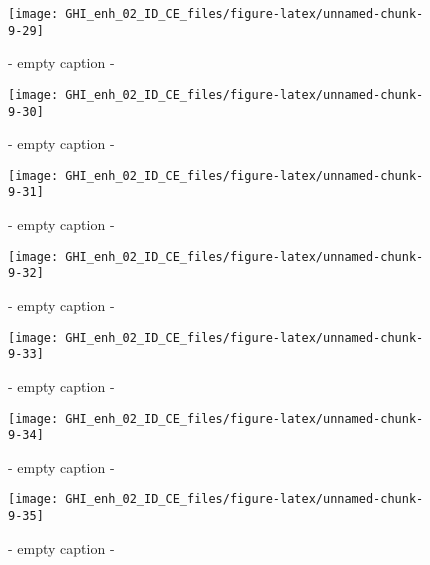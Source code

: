 \documentclass[
  10pt,
  a4paper,oneside]{article}
\begin{document}
\begin{figure}[H]

{\centering \texttt{[image: GHI\_enh\_02\_ID\_CE\_files/figure-latex/unnamed-chunk-9-29]} 

}

\caption{ - empty caption - }\label{fig:unnamed-chunk-9-29}
\end{figure}
\begin{figure}[H]

{\centering \texttt{[image: GHI\_enh\_02\_ID\_CE\_files/figure-latex/unnamed-chunk-9-30]} 

}

\caption{ - empty caption - }\label{fig:unnamed-chunk-9-30}
\end{figure}
\begin{figure}[H]

{\centering \texttt{[image: GHI\_enh\_02\_ID\_CE\_files/figure-latex/unnamed-chunk-9-31]} 

}

\caption{ - empty caption - }\label{fig:unnamed-chunk-9-31}
\end{figure}
\begin{figure}[H]

{\centering \texttt{[image: GHI\_enh\_02\_ID\_CE\_files/figure-latex/unnamed-chunk-9-32]} 

}

\caption{ - empty caption - }\label{fig:unnamed-chunk-9-32}
\end{figure}
\begin{figure}[H]

{\centering \texttt{[image: GHI\_enh\_02\_ID\_CE\_files/figure-latex/unnamed-chunk-9-33]} 

}

\caption{ - empty caption - }\label{fig:unnamed-chunk-9-33}
\end{figure}
\begin{figure}[H]

{\centering \texttt{[image: GHI\_enh\_02\_ID\_CE\_files/figure-latex/unnamed-chunk-9-34]} 

}

\caption{ - empty caption - }\label{fig:unnamed-chunk-9-34}
\end{figure}
\begin{figure}[H]

{\centering \texttt{[image: GHI\_enh\_02\_ID\_CE\_files/figure-latex/unnamed-chunk-9-35]} 

}

\caption{ - empty caption - }\label{fig:unnamed-chunk-9-35}
\end{figure}
\end{document}

